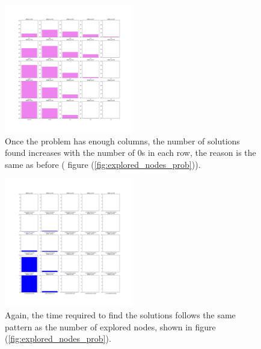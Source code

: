 \documentclass{beamer}
\begin{document}
\begin{frame}{}
    \begin{figure}
        \centering
        \includegraphics[width=0.5\textwidth]{solutions_prob.pdf}
        \caption{Once the problem has enough columns, the number of solutions found 
        increases with the number of 0s in each row, the reason is the same as before (
        figure (\ref{fig:explored_nodes_prob})).}
        \label{fig:solutions_prob}
    \end{figure}
\end{frame}

\begin{frame}{}
    \begin{figure}
        \centering
        \includegraphics[width=0.5\textwidth]{time_to_solve_prob.pdf}
        \caption{Again, the time required to find the solutions follows the same pattern as 
        the number of explored nodes, shown in figure (\ref{fig:explored_nodes_prob}).}
        \label{fig:time_to_solve_prob}
    \end{figure}
\end{frame}
\end{document}
